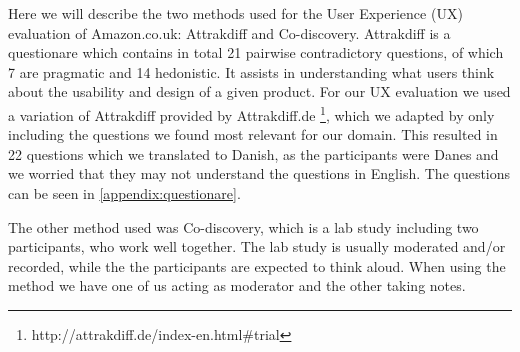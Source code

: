Here we will describe the two methods used for the User Experience (UX) evaluation of Amazon.co.uk: Attrakdiff and Co-discovery.
Attrakdiff is a questionare which contains in total 21 pairwise contradictory questions, of which 7 are pragmatic and 14 hedonistic. It assists in understanding what users think about the usability and design of a given product. For our UX evaluation we used a variation of Attrakdiff provided by Attrakdiff.de \footnote{http://attrakdiff.de/index-en.html$\#$trial}, which we adapted by only including the questions we found most relevant for our domain. This resulted in 22 questions which we translated to Danish, as the participants were Danes and we worried that they may not understand the questions in English. The questions can be seen in \autoref{appendix:questionare}.

The other method used was Co-discovery, which is a lab study including two participants, who work well together. The lab study is usually moderated and/or recorded, while the the participants are expected to think aloud. When using the method we have one of us acting as moderator and the other taking notes.